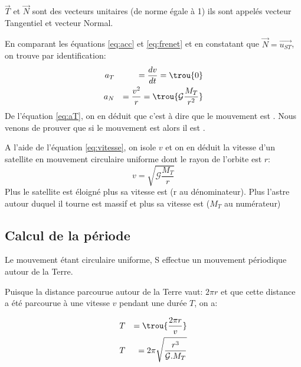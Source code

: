 $ \overrightarrow{T}$ et $ \overrightarrow{N}$ sont des vecteurs unitaires (de norme égale à 1) ils sont appelés vecteur Tangentiel et vecteur Normal.

 En comparant les équations \ref{eq:acc} et \ref{eq:frenet} et en constatant que $ \overrightarrow{N}= \overrightarrow{u_{ST}}$, on trouve par identification:
 \begin{eqnarray}
 a_T && = \frac{dv}{dt}= \trou{0} \label{eq:aT}\\
 a_N && = \frac{v^2}{r}=\trou{ \mathcal{G}\frac{M_T}{r^2}} \label{eq:vitesse}
 \end{eqnarray}
De l'équation \ref{eq:aT}, on en déduit que  c'est à dire que le mouvement est .
Nous venons de prouver que si le mouvement est  alors il est .


A l'aide de l'équation \ref{eq:vitesse}, on isole $v$ et on en déduit la vitesse d'un satellite en mouvement circulaire uniforme dont le rayon de l'orbite est $r$:
\begin{equation}
\boxed{v=\sqrt{\mathcal{G}\frac{M_T}{r}}}
\end{equation}
 Plus le satellite est éloigné plus sa vitesse est  (r au dénominateur). Plus l'astre autour duquel il tourne est massif et plus sa vitesse est  ($M_T$ au numérateur)
\subsection{Calcul de la période}
Le mouvement étant circulaire uniforme, S effectue un mouvement périodique autour de la Terre. 


 
 Puisque la distance parcourue autour de la Terre vaut: $2\pi r$ et que cette distance a été parcourue à une vitesse $v$ pendant une durée $T$, on a:
 
\begin{eqnarray}
T  && =\trou{ \frac{2 \pi r}{v} }\label{eq:periode}\\
T  && = 2\pi \sqrt{\frac{r^3}{\mathcal{G}.M_T}} \label{eq:periodeG}
\end{eqnarray}

\newpage
{}
\vspace{6cm}
